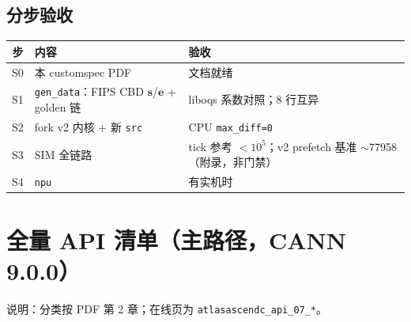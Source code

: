 \documentclass[UTF8,a4paper,11pt]{ctexart}
\begin{document}
\subsection{分步验收}
\begin{table}[h]
  \centering
  \begin{tabular}{@{}cll@{}}
    \toprule
    步 & 内容 & 验收 \\
    \midrule
    S0 & 本 customspec PDF & 文档就绪 \\
    S1 & \texttt{gen\_data}：FIPS CBD $\mathbf{s}$/$\mathbf{e}$ + golden 链 & liboqs 系数对照；8 行互异 \\
    S2 & fork v2 内核 + 新 \texttt{src} & CPU \texttt{max\_diff=0} \\
    S3 & SIM 全链路 & tick 参考 $<10^5$；v2 prefetch 基准 $\sim$77958（附录，非门禁） \\
    S4 & \texttt{npu} & 有实机时 \\
    \bottomrule
  \end{tabular}
\end{table}

\section{全量 API 清单（主路径，CANN 9.0.0）}
\label{sec:api}

说明：分类按 PDF 第 2 章；在线页为 \texttt{atlasascendc\_api\_07\_*}。
\end{document}
